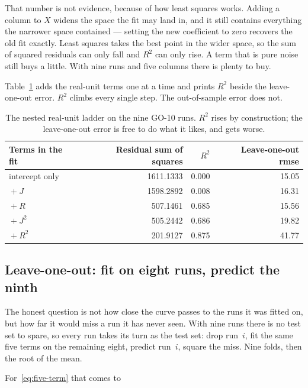 That number is not evidence, because of how least squares works. Adding a column to $X$ widens
the space the fit may land in, and it still contains everything the narrower space contained ---
setting the new coefficient to zero recovers the old fit exactly. Least squares takes the best
point in the wider space, so the sum of squared residuals can only fall and $R^{2}$ can only
rise. A term that is pure noise still buys a little. With nine runs and five columns there is
plenty to buy.

Table~\ref{tab:r2-ladder} adds the real-unit terms one at a time and prints $R^{2}$ beside the
leave-one-out error. $R^{2}$ climbs every single step. The out-of-sample error does not.

\begin{table}[htbp]
  \centering
  \caption{The nested real-unit ladder on the nine GO-10 runs. $R^{2}$ rises by construction;
  the leave-one-out error is free to do what it likes, and gets worse.}
  \label{tab:r2-ladder}
  \begin{tabular}{@{}lrrr@{}}
    \toprule
    Terms in the fit & Residual sum of squares & $R^{2}$ & Leave-one-out rmse \\
    \midrule
    intercept only              & 1611.1333 & 0.000 & 15.05 \\
    ${}+J$                      & 1598.2892 & 0.008 & 16.31 \\
    ${}+R$                      &  507.1461 & 0.685 & 15.56 \\
    ${}+J^{2}$                  &  505.2442 & 0.686 & 19.82 \\
    ${}+R^{2}$                  &  201.9127 & 0.875 & 41.77 \\
    \bottomrule
  \end{tabular}
\end{table}

\subsection{Leave-one-out: fit on eight runs, predict the ninth}

The honest question is not how close the curve passes to the runs it was fitted on, but how far
it would miss a run it has never seen. With nine runs there is no test set to spare, so every run
takes its turn as the test set: drop run~$i$, fit the same five terms on the remaining eight,
predict run~$i$, square the miss. Nine folds, then the root of the mean.

For~\eqref{eq:five-term} that comes to


